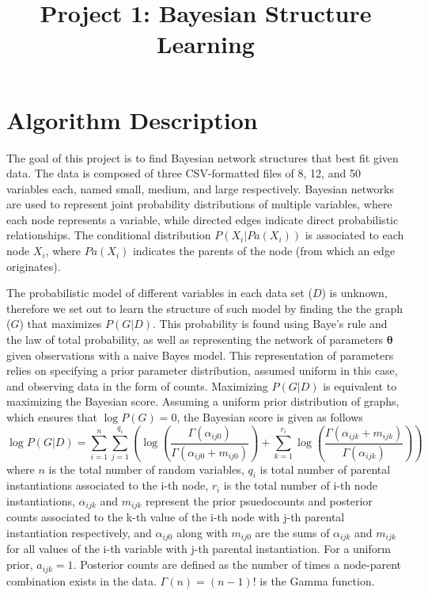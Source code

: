 \documentclass[twoside,11pt]{article}
\begin{document}
\title{Project 1: Bayesian Structure Learning}


\maketitle

\section{Algorithm Description}

The goal of this project is to find Bayesian network structures that best fit given data. The data is composed of three CSV-formatted files of 8, 12, and 50 variables each, named small, medium, and large respectively. Bayesian networks are used to represent joint probability distributions of multiple variables, where each node represents a variable, while directed edges indicate direct probabilistic relationships. The conditional distribution $P(X_i \vert Pa(X_i))$ is associated to each node $X_i$, where $Pa(X_i)$ indicates the parents of the node (from which an edge originates).

The probabilistic model of different variables in each data set ($D$) is unknown, therefore we set out to learn the structure of such model by finding the the graph ($G$) that maximizes $P(G\vert D)$. This probability is found using Baye's rule and the law of total probability, as well as representing the network of parameters $\mathbf{\theta}$ given observations with a naive Bayes model. This representation of parameters relies on specifying a prior parameter distribution, assumed uniform in this case, and observing data in the form of counts. Maximizing $P(G\vert D)$ is equivalent to maximizing the Bayesian score. Assuming a uniform prior distribution of graphs, which ensures that $\log{P(G)} =0$, the Bayesian score is given as follows 
\begin{equation}
    \log P(G\vert D ) = \sum^{n}_{i=1}\sum^{q_i}_{j=1} \left ( \log \left(\frac{\Gamma(\alpha_{ij0})}{\Gamma (\alpha_{ij0} + m_{ij0})}\right) + \sum^{r_i}_{k=1} \log \left(\frac{\Gamma (\alpha_{ijk} + m_{ijk})}{\Gamma(\alpha_{ijk})}\right)\right)
\label{eqn:bs}
\end{equation}
where $n$ is the total number of random variables, $q_i$ is total number of parental instantiations associated to the i-th node, $r_i$ is the total number of i-th node instantiations, $\alpha_{ijk}$ and $m_{ijk}$ represent the prior psuedocounts and posterior counts associated to the k-th value of the i-th node with j-th parental instantiation respectively, and $\alpha_{ij0}$ along with $m_{ij0}$ are the sums of $\alpha_{ijk}$ and $m_{ijk}$ for all values of the i-th variable with j-th parental instantiation. For a uniform prior, $a_{ijk} = 1$. Posterior counts are defined as the number of times a node-parent combination exists in the data. $\Gamma(n) = (n-1)!$ is the Gamma function.
\end{document}
